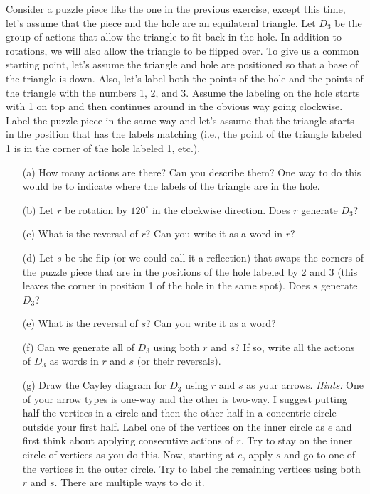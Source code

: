 \begin{exercise}\label{exer:introducing_D3}
Consider a puzzle piece like the one in the previous exercise, except this time, let's assume that the piece and the hole are an equilateral triangle.  Let \(D_3\) be the group of actions that allow the triangle to fit back in the hole.  In addition to rotations, we will also allow the triangle to be flipped over.  To give us a common starting point, let's assume the triangle and hole are positioned so that a base of the triangle is down.  Also, let's label both the points of the hole and the points of the triangle with the numbers 1, 2, and 3.  Assume the labeling on the hole starts with 1 on top and then continues around in the obvious way going clockwise.  Label the puzzle piece in the same way and let's assume that the triangle starts in the position that has the labels matching (i.e., the point of the triangle labeled 1 is in the corner of the hole labeled 1, etc.).
\begin{enumerate}
\item[(a)] How many actions are there?  Can you describe them?  One way to do this would be to indicate where the labels of the triangle are in the hole.
\item[(b)] Let \(r\) be rotation by \(120^\circ\) in the clockwise direction.  Does \(r\) generate \(D_3\)?
\item[(c)] What is the reversal of \(r\)?  Can you write it as a word in \(r\)?
\item[(d)] Let \(s\) be the flip (or we could call it a reflection) that swaps the corners of the puzzle piece that are in the positions of the hole labeled by 2 and 3 (this leaves the corner in position 1 of the hole in the same spot).  Does \(s\) generate \(D_3\)?
\item[(e)] What is the reversal of \(s\)?  Can you write it as a word?
\item[(f)] Can we generate all of \(D_3\) using both \(r\) and \(s\)?  If so, write all the actions of \(D_3\) as words in \(r\) and \(s\) (or their reversals).
\item[(g)] Draw the Cayley diagram for \(D_3\) using \(r\) and \(s\) as your arrows.  \emph{Hints:} One of your arrow types is one-way and the other is two-way.  I suggest putting half the vertices in a circle and then the other half in a concentric circle outside your first half.  Label one of the vertices on the inner circle as \(e\) and first think about applying consecutive actions of \(r\).  Try to stay on the inner circle of vertices as you do this.  Now, starting at \(e\), apply \(s\) and go to one of the vertices in the outer circle.  Try to label the remaining vertices using both \(r\) and \(s\).  There are multiple ways to do it.
\end{enumerate}
\end{exercise}

